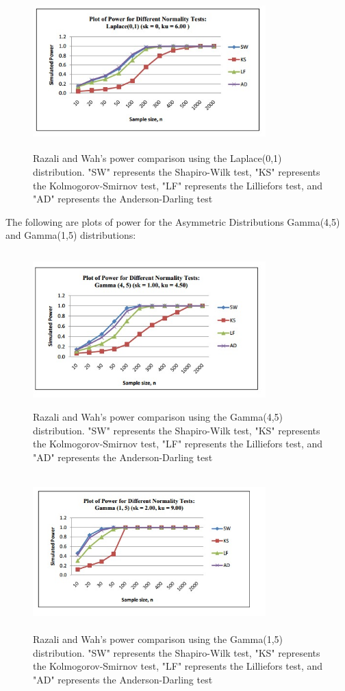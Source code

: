 \documentclass[letterpaper,english, 12pt]{article}
\begin{document}
\begin{figure}[t]
	\centering
	\includegraphics[height=6cm,width=90mm]{pics/razali2.jpg}
	\caption{Razali and Wah's power comparison using the Laplace(0,1) distribution. "SW" represents the Shapiro-Wilk test, "KS" represents the Kolmogorov-Smirnov test, "LF" represents the Lilliefors test, and "AD" represents the Anderson-Darling test}
\end{figure}

The following are plots of power for the Asymmetric Distributions Gamma(4,5) and Gamma(1,5) distributions:

\begin{figure}[t]
	\centering
	\includegraphics[height=6cm,width=90mm]{pics/razali3.jpg}
	\caption{Razali and Wah's power comparison using the Gamma(4,5) distribution. "SW" represents the Shapiro-Wilk test, "KS" represents the Kolmogorov-Smirnov test, "LF" represents the Lilliefors test, and "AD" represents the Anderson-Darling test}
\end{figure}

\begin{figure}[t]
	\centering
	\includegraphics[height=6cm,width=90mm]{pics/razali4.jpg}
	\caption{Razali and Wah's power comparison using the Gamma(1,5) distribution. "SW" represents the Shapiro-Wilk test, "KS" represents the Kolmogorov-Smirnov test, "LF" represents the Lilliefors test, and "AD" represents the Anderson-Darling test}
\end{figure}
\end{document}
